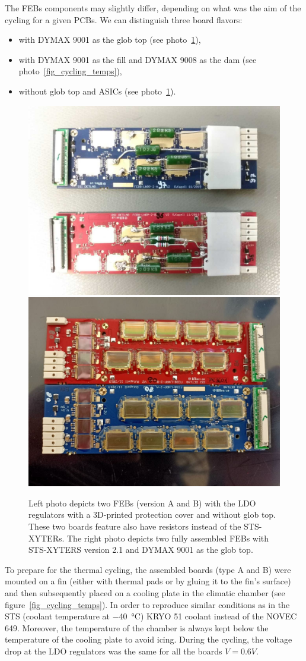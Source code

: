 The \gls{FEB}s components may slightly differ, depending on what was the aim of the cycling for a given \glspl{PCB}. We can distinguish three board flavors:
\begin{itemize}
    \item with DYMAX 9001 as the glob top (see photo~\ref{fig_noglobtop}),
    \item with DYMAX 9001 as the fill and DYMAX 9008 as the dam (see photo~\ref{fig_cycling_temps}), 
    \item without glob top and \glspl{ASIC} (see photo~\ref{fig_noglobtop}).
    \end{itemize}
\newpage
\begin{figure}[!h]
\centering
\includegraphics[width=0.45\columnwidth]{Chapter4/images/noglobtop.jpg}
\includegraphics[width=0.45\columnwidth]{Chapter4/images/globtop.jpg}
\caption{Left photo depicts two \glspl{FEB} (version A and B) with the \gls{LDO} regulators with a 3D-printed protection cover and without glob top. These two boards feature also have resistors instead of the STS-XYTERs.
The right photo depicts two fully assembled \gls{FEB}s with STS-XYTERS version 2.1 and DYMAX 9001 as the glob top.}
\label{fig_noglobtop}
\end{figure}

To prepare for the thermal cycling, the assembled boards (type A and B) were mounted on a fin (either with thermal pads or by gluing it to the fin's surface) and then subsequently placed on a cooling plate in the climatic chamber (see figure~\ref{fig_cycling_temps}). In order to reproduce similar conditions as in the \gls{STS} (coolant temperature at \SI{-40}{\celsius}) KRYO 51 coolant instead of the NOVEC 649. Moreover, the temperature of the chamber is always kept below the temperature of the cooling plate to avoid icing. During the cycling, the voltage drop at the \gls{LDO} regulators was the same for all the boards $V=0.6V$. 

